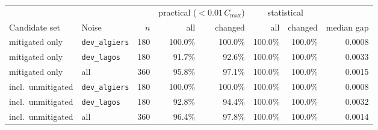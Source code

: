 \begin{tabular}{@{}llrrrrrr@{}}
\toprule
 & & & \multicolumn{2}{c}{practical ($<0.01\,C_{\max}$)} & \multicolumn{2}{c}{statistical} & \\
\cmidrule(lr){4-5}\cmidrule(lr){6-7}
Candidate set & Noise & $n$ & all & changed & all & changed & median gap\\
\midrule
mitigated only & \texttt{dev\_algiers} & 180 & 100.0\% & 100.0\% & 100.0\% & 100.0\% & 0.0008\\
mitigated only & \texttt{dev\_lagos} & 180 & 91.7\% & 92.6\% & 100.0\% & 100.0\% & 0.0033\\
mitigated only & all & 360 & 95.8\% & 97.1\% & 100.0\% & 100.0\% & 0.0015\\
incl.\ unmitigated & \texttt{dev\_algiers} & 180 & 100.0\% & 100.0\% & 100.0\% & 100.0\% & 0.0008\\
incl.\ unmitigated & \texttt{dev\_lagos} & 180 & 92.8\% & 94.4\% & 100.0\% & 100.0\% & 0.0032\\
incl.\ unmitigated & all & 360 & 96.4\% & 97.8\% & 100.0\% & 100.0\% & 0.0014\\
\bottomrule
\end{tabular}
